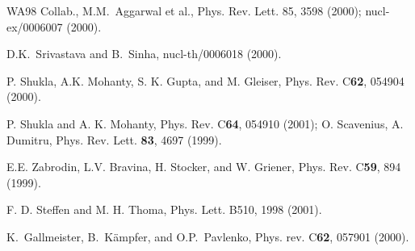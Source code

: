 \begin{thebibliography}{00}

 WA98 Collab., M.M.\ Aggarwal et al., 
            Phys. Rev. Lett. 85, 3598 (2000); nucl-ex/0006007 (2000).

 D.K.\ Srivastava and B.\ Sinha, nucl-th/0006018 (2000).

 P. Shukla, A.K. Mohanty, S. K. Gupta, and M. Gleiser,
              Phys. Rev. C{\bf 62}, 054904 (2000).

 P. Shukla and A. K. Mohanty, Phys. Rev. C{\bf 64},
        054910 (2001); O. Scavenius, A. Dumitru, 
        Phys. Rev. Lett. {\bf 83}, 4697 (1999).

 E.E. Zabrodin, L.V. Bravina, H. Stocker, and W. Griener,
         Phys. Rev. C{\bf 59}, 894 (1999).

 F. D. Steffen and M. H. Thoma, Phys. Lett. B510, 
                  1998 (2001).       
                  
 K.\ Gallmeister, B.\ K\"ampfer, and O.P.\ Pavlenko, 
            Phys. rev. C{\bf 62}, 057901 (2000).

\end{thebibliography}





